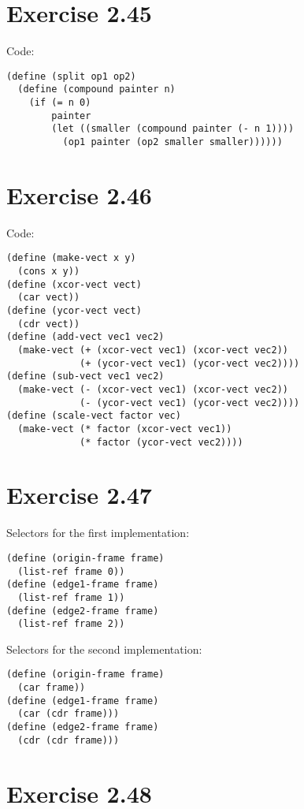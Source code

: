 \documentclass[../main.tex]{subfiles}
\begin{document}
\section{Exercise 2.45}

Code:

\begin{lstlisting}
(define (split op1 op2)
  (define (compound painter n)
    (if (= n 0)
        painter
        (let ((smaller (compound painter (- n 1))))
          (op1 painter (op2 smaller smaller))))))
\end{lstlisting}

\section{Exercise 2.46}

Code:

\begin{lstlisting}
(define (make-vect x y)
  (cons x y))
(define (xcor-vect vect)
  (car vect))
(define (ycor-vect vect)
  (cdr vect))
(define (add-vect vec1 vec2)
  (make-vect (+ (xcor-vect vec1) (xcor-vect vec2))
             (+ (ycor-vect vec1) (ycor-vect vec2))))
(define (sub-vect vec1 vec2)
  (make-vect (- (xcor-vect vec1) (xcor-vect vec2))
             (- (ycor-vect vec1) (ycor-vect vec2))))
(define (scale-vect factor vec)
  (make-vect (* factor (xcor-vect vec1))
             (* factor (ycor-vect vec2))))
\end{lstlisting}

\section{Exercise 2.47}

Selectors for the first implementation:

\begin{lstlisting}
(define (origin-frame frame)
  (list-ref frame 0))
(define (edge1-frame frame)
  (list-ref frame 1))
(define (edge2-frame frame)
  (list-ref frame 2))
\end{lstlisting}

Selectors for the second implementation:

\begin{lstlisting}
(define (origin-frame frame)
  (car frame))
(define (edge1-frame frame)
  (car (cdr frame)))
(define (edge2-frame frame)
  (cdr (cdr frame)))
\end{lstlisting}

\section{Exercise 2.48}
\end{document}
